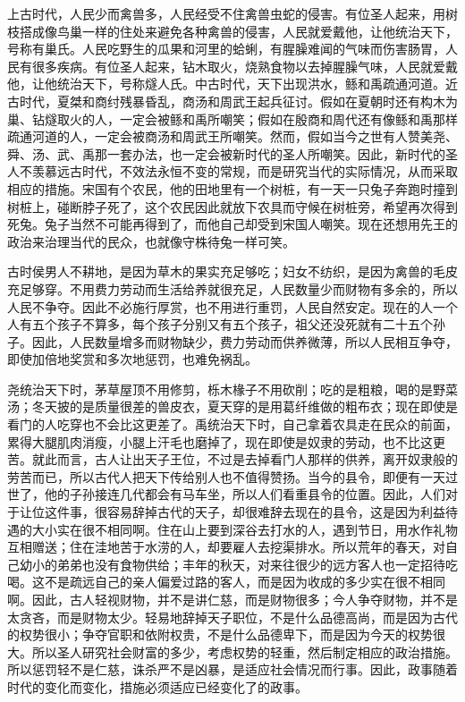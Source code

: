 \documentclass[12pt,UTF-8,openany,a4]{ctexbook}
\begin{document}
\begin{large}\yiwen
    
    上古时代，人民少而禽兽多，人民经受不住禽兽虫蛇的侵害。有位圣人起来，用树枝搭成像鸟巢一样的住处来避免各种禽兽的侵害，人民就爱戴他，让他统治天下，号称有巢氏。人民吃野生的瓜果和河里的蛤蜊，有腥臊难闻的气味而伤害肠胃，人民有很多疾病。有位圣人起来，钻木取火，烧熟食物以去掉腥臊气味，人民就爱戴他，让他统治天下，号称燧人氏。中古时代，天下出现洪水，鲧和禹疏通河道。近古时代，夏桀和商纣残暴昏乱，商汤和周武王起兵征讨。假如在夏朝时还有构木为巢、钻燧取火的人，一定会被鲧和禹所嘲笑；假如在殷商和周代还有像鲧和禹那样疏通河道的人，一定会被商汤和周武王所嘲笑。然而，假如当今之世有人赞美尧、舜、汤、武、禹那一套办法，也一定会被新时代的圣人所嘲笑。因此，新时代的圣人不羡慕远古时代，不效法永恒不变的常规，而是研究当代的实际情况，从而采取相应的措施。宋国有个农民，他的田地里有一个树桩，有一天一只兔子奔跑时撞到树桩上，碰断脖子死了，这个农民因此就放下农具而守候在树桩旁，希望再次得到死兔。兔子当然不可能再得到了，而他自己却受到宋国人嘲笑。现在还想用先王的政治来治理当代的民众，也就像守株待兔一样可笑。
    
    古时侯男人不耕地，是因为草木的果实充足够吃；妇女不纺织，是因为禽兽的毛皮充足够穿。不用费力劳动而生活给养就很充足，人民数量少而财物有多余的，所以人民不争夺。因此不必施行厚赏，也不用进行重罚，人民自然安定。现在的人一个人有五个孩子不算多，每个孩子分别又有五个孩子，祖父还没死就有二十五个孙子。因此，人民数量增多而财物缺少，费力劳动而供养微薄，所以人民相互争夺，即使加倍地奖赏和多次地惩罚，也难免祸乱。
    
    尧统治天下时，茅草屋顶不用修剪，栎木椽子不用砍削；吃的是粗粮，喝的是野菜汤；冬天披的是质量很差的兽皮衣，夏天穿的是用葛纤维做的粗布衣；现在即使是看门的人吃穿也不会比这更差了。禹统治天下时，自己拿着农具走在民众的前面，累得大腿肌肉消瘦，小腿上汗毛也磨掉了，现在即使是奴隶的劳动，也不比这更苦。就此而言，古人让出天子王位，不过是去掉看门人那样的供养，离开奴隶般的劳苦而已，所以古代人把天下传给别人也不值得赞扬。当今的县令，即便有一天过世了，他的子孙接连几代都会有马车坐，所以人们看重县令的位置。因此，人们对于让位这件事，很容易辞掉古代的天子，却很难辞去现在的县令，这是因为利益待遇的大小实在很不相同啊。住在山上要到深谷去打水的人，遇到节日，用水作礼物互相赠送；住在洼地苦于水涝的人，却要雇人去挖渠排水。所以荒年的春天，对自己幼小的弟弟也没有食物供给；丰年的秋天，对来往很少的远方客人也一定招待吃喝。这不是疏远自己的亲人偏爱过路的客人，而是因为收成的多少实在很不相同啊。因此，古人轻视财物，并不是讲仁慈，而是财物很多；今人争夺财物，并不是太贪吝，而是财物太少。轻易地辞掉天子职位，不是什么品德高尚，而是因为古代的权势很小；争夺官职和依附权贵，不是什么品德卑下，而是因为今天的权势很大。所以圣人研究社会财富的多少，考虑权势的轻重，然后制定相应的政治措施。所以惩罚轻不是仁慈，诛杀严不是凶暴，是适应社会情况而行事。因此，政事随着时代的变化而变化，措施必须适应已经变化了的政事。
    

\end{large}
\end{document}
